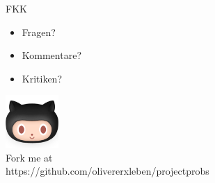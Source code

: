 \documentclass[12pt]{beamer}
\begin{document}
	\begin{frame}{FKK}
		\begin{itemize}
			\item{Fragen?}
			\item{Kommentare?}
			\item{Kritiken?}
		\end{itemize}

	\end{frame}

	\thispagestyle{empty}
	\begin{frame}
		\begin{center}
			\includegraphics[width=0.15\textwidth]{images/github} \\
			Fork me at \\
			https://github.com/olivererxleben/projectprobs
		\end{center}
	\end{frame}
\end{document}
